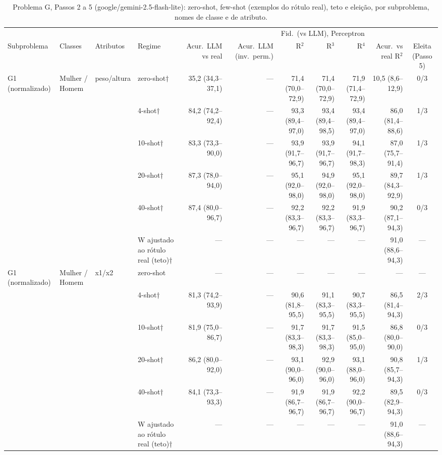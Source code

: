 \begin{table}[htbp]
\centering
\footnotesize
\caption{Problema G, Passos 2 a 5 (google/gemini-2.5-flash-lite): zero-shot, few-shot (exemplos do rótulo real), teto e eleição, por subproblema, nomes de classe e de atributo.}
\label{tab:bloco3_G_passos_2_a_5_flashlite}
\begin{tabular}{llllrrrrrrc}
\toprule
 &  &  &  &  &  & \multicolumn{3}{c}{Fid.\ (vs LLM), Perceptron} &  &  \\ \cmidrule(lr){7-9}
Subproblema & Classes & Atributos & Regime & Acur.\ LLM vs real & Acur.\ LLM (inv.\ perm.) & R$^2$ & R$^3$ & R$^4$ & Acur.\ vs real R$^2$ & Eleita (Passo 5) \\
\midrule
G1 (normalizado) & Mulher / Homem & peso/altura & zero-shot† & 35,2 (34,3–37,1) & — & 71,4 (70,0–72,9) & 71,4 (70,0–72,9) & 71,9 (71,4–72,9) & 10,5 (8,6–12,9) & 0/3 \\
 &  &  & 4-shot† & 84,2 (74,2–92,4) & — & 93,3 (89,4–97,0) & 93,4 (89,4–98,5) & 93,4 (89,4–97,0) & 86,0 (81,4–88,6) & 1/3 \\
 &  &  & 10-shot† & 83,3 (73,3–90,0) & — & 93,9 (91,7–96,7) & 93,9 (91,7–96,7) & 94,1 (91,7–98,3) & 87,0 (75,7–91,4) & 1/3 \\
 &  &  & 20-shot† & 87,3 (78,0–94,0) & — & 95,1 (92,0–98,0) & 94,9 (92,0–98,0) & 95,1 (92,0–98,0) & 89,7 (84,3–92,9) & 1/3 \\
 &  &  & 40-shot† & 87,4 (80,0–96,7) & — & 92,2 (83,3–96,7) & 92,2 (83,3–96,7) & 91,9 (83,3–96,7) & 90,2 (87,1–94,3) & 0/3 \\
 &  &  & W ajustado ao rótulo real (teto)† & — & — & — & — & — & 91,0 (88,6–94,3) & — \\
\midrule
G1 (normalizado) & Mulher / Homem & x1/x2 & zero-shot & — & — & — & — & — & — & — \\
 &  &  & 4-shot† & 81,3 (74,2–93,9) & — & 90,6 (81,8–95,5) & 91,1 (83,3–95,5) & 90,7 (83,3–95,5) & 86,5 (81,4–94,3) & 2/3 \\
 &  &  & 10-shot† & 81,9 (75,0–86,7) & — & 91,7 (83,3–98,3) & 91,7 (83,3–98,3) & 91,5 (85,0–95,0) & 86,8 (80,0–90,0) & 0/3 \\
 &  &  & 20-shot† & 86,2 (80,0–92,0) & — & 93,1 (90,0–96,0) & 92,9 (90,0–96,0) & 93,1 (88,0–96,0) & 90,8 (85,7–94,3) & 1/3 \\
 &  &  & 40-shot† & 84,1 (73,3–93,3) & — & 91,9 (86,7–96,7) & 91,9 (86,7–96,7) & 92,2 (90,0–96,7) & 89,5 (82,9–94,3) & 0/3 \\
 &  &  & W ajustado ao rótulo real (teto)† & — & — & — & — & — & 91,0 (88,6–94,3) & — \\

\end{tabular}
\end{table}
